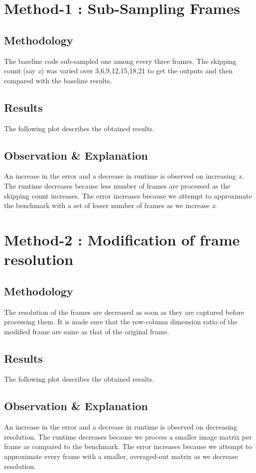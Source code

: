 \documentclass[a4paper]{article}
\begin{document}
\section*{Method-1 : Sub-Sampling Frames}
\subsection*{Methodology}
The baseline code sub-sampled one among every three frames. The skipping count (say \textit{x}) was varied over 3,6,9,12,15,18,21 to get the outputs and then compared with the baseline results. 
\subsection*{Results}
The following plot describes the obtained results.
\subsection*{Observation \& Explanation}
An increase in the error and a decrease in runtime is observed on increasing \textit{x}. The runtime decreases because less number of frames are processed as the skipping count increases. The error increases because we attempt to approximate the benchmark with a set of lesser number of frames as we increase \textit{x}.
\section*{Method-2 :  Modification of frame resolution }
\subsection*{Methodology}
The resolution of the frames are decreased as soon as they are captured before processing them. It is made sure that the row-column dimension ratio of the modified frame are same as that of the original frame.
\subsection*{Results}
The following plot describes the obtained results.
\subsection*{Observation \& Explanation}
An increase in the error and a decrease in runtime is observed on decreasing resolution. The runtime decreases because we process a smaller image matrix per frame as compared to the benchmark. The error increases because we attempt to approximate every frame with a smaller, averaged-out matrix as we decrease resolution.
\end{document}
